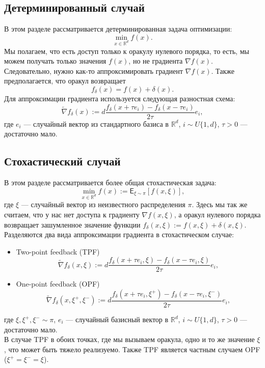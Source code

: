 \documentclass{article}
\begin{document}
\subsection{Детерминированный случай}
В этом разделе рассматривается детерминированная задача оптимизации:
\begin{equation}
 \min\limits_{x \in \mathbb{R}^d} f(x).
 \label{determenistic_problem}
\end{equation}
Мы полагаем, что есть доступ только к оракулу нулевого порядка, то есть, мы можем получать только значения $f(x)$, но не градиента $\nabla f(x)$. Следовательно, нужно как-то аппроксимировать градиент $\nabla f(x)$. Также предполагается, что оракул возвращает
\begin{equation}
 f_\delta (x) = f(x) + \delta (x).
\end{equation}
Для аппроксимации градиента используется следующая разностная схема:
\begin{equation}
\widetilde{\nabla} f_\delta (x) := d\frac{f_\delta (x + \tau e_i) - f_\delta (x - \tau e_i)}{2\tau} e_i,
\label{diff_scheme}
\end{equation}
где $e_i$ --- случайный вектор из стандартного базиса в $\mathbb{R}^d$, $i \sim U\{1, d\}$, $\tau > 0$ --- достаточно мало.

\subsection{Стохастический случай}
В этом разделе рассматривается более общая стохастическая задача:
\begin{equation}
 \min\limits_{x \in \mathbb{R}^d} f(x) := \mathsf{E}_{\xi \sim \pi}[f(x, \xi)],
\end{equation}
где $\xi$ --- случайный вектор из неизвестного распределения $\pi$. Здесь мы так же считаем, что у нас нет доступа к градиенту $\nabla f(x, \xi)$, а оракул нулевого порядка возвращает зашумленное значение функции $f_\delta (x, \xi) := f(x, \xi) + \delta (x, \xi)$.\\
Разделяются два вида аппроксимации градиента в стохастическом случае:
\begin{itemize}
 \item Two-point feedback (TPF)
 \begin{equation}
  \widetilde{\nabla} f_\delta (x, \xi) := d\frac{f_\delta (x + \tau e_i, \xi) - f_\delta (x - \tau e_i, \xi)}{2\tau} e_i,
 \end{equation}
 \item One-point feedback (OPF)
 \begin{equation}
  \widetilde{\nabla} f_\delta (x, \xi^+, \xi^-) := d\frac{f_\delta (x + \tau e_i, \xi^+) - f_\delta (x - \tau e_i, \xi^-)}{2\tau} e_i,
 \end{equation}
\end{itemize}
где $\xi, \xi^+, \xi^- \sim \pi$, $e_i$ --- случайный базисный вектор в $\mathbb{R}^d$, $i \sim U\{1, d\}$, $\tau > 0$ --- достаточно мало.\\
В случае TPF в обоих точках, где мы вызываем оракула, одно и то же значение $\xi$, что может быть тяжело реализуемо. Также TPF является частным случаем OPF ($\xi^+ = \xi^- = \xi$).
\end{document}
